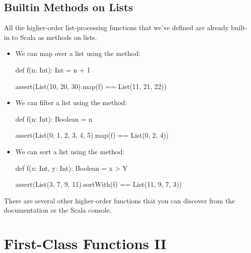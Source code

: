 \documentclass[9pt]{extbook}
\begin{document}
\section{Builtin Methods on Lists}

All the higher-order list-processing functions that we've defined are already
built-in to Scala as methods on lists.

\begin{itemize}

\item
We can map over a list using the  method:

\begin{scalacode}
def f(n: Int): Int = n + 1

assert(List(10, 20, 30).map(f) == List(11, 21, 22))
\end{scalacode}

\item We can filter a list using the  method:

\begin{scalacode}
def f(n: Int): Boolean = n %

assert(List(0, 1, 2, 3, 4, 5).map(f) == List(0, 2, 4))
\end{scalacode}

\item We can sort a list using the  method:

\begin{scalacode}
def f(x: Int, y: Int): Boolean = x > Y

assert(List(3, 7, 9, 11).sortWith(f) == List(11, 9, 7, 3))
\end{scalacode}

\end{itemize}

There are several other higher-order functions that you can discover from
the documentation or the Scala console.

\chapter{First-Class Functions II}
\end{document}
